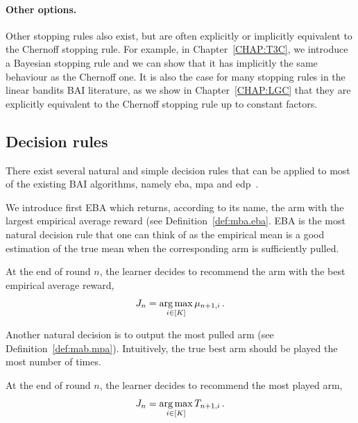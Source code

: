 \paragraph{Other options.}
Other stopping rules also exist, but are often explicitly or implicitly equivalent to the Chernoff stopping rule. For example, in Chapter~\ref{CHAP:T3C}, we introduce a \gls{Bayesian stopping rule} and we can show that it has implicitly the same behaviour as the Chernoff one. It is also the case for many stopping rules in the linear bandits BAI literature, as we show in Chapter~\ref{CHAP:LGC} that they are explicitly equivalent to the Chernoff stopping rule up to constant factors.

\subsection{Decision rules}\label{sec:mab.bai.decision}

There exist several natural and simple decision rules that can be applied to most of the existing BAI algorithms, namely \gls{eba}, \gls{mpa} and \gls{edp}~\citep{bubeck2009pure}.

We introduce first EBA which returns, according to its name, the arm with the largest empirical average reward (see Definition~\ref{def:mba.eba}. EBA is the most natural decision rule that one can think of as the empirical mean is a good estimation of the true mean when the corresponding arm is sufficiently pulled.

\begin{definition}
\begin{leftbar}[defnbar]\label{def:mba.eba}
    At the end of round $n$, the learner decides to recommend the arm with the best empirical average reward,
    \[
        J_n = \operatorname*{arg\,max}_{i\in[K]} \mu_{n+1,i}\,.
    \]
\end{leftbar}
\end{definition}

Another natural decision is to output the most pulled arm (see Definition~\ref{def:mab.mpa}). Intuitively, the true best arm should be played the most number of times.

\begin{definition}
\begin{leftbar}[defnbar]\label{def:mab.mpa}
    At the end of round $n$, the learner decides to recommend the most played arm,
    \[
        J_n = \operatorname*{arg\,max}_{i\in[K]} T_{n+1,i}\,.
    \]
\end{leftbar}
\end{definition}

